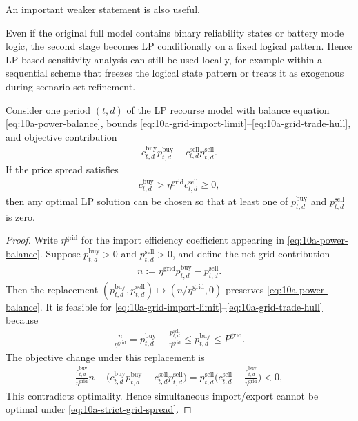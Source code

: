 An important weaker statement is also useful.

\begin{remark}
Even if the original full model contains binary reliability states or battery mode logic, the second stage becomes LP conditionally on a fixed logical pattern. Hence LP-based sensitivity analysis can still be used locally, for example within a sequential scheme that freezes the logical state pattern or treats it as exogenous during scenario-set refinement.
\end{remark}

\begin{proposition}
Consider one period \((t,d)\) of the LP recourse model with balance equation \eqref{eq:10a-power-balance}, bounds \eqref{eq:10a-grid-import-limit}--\eqref{eq:10a-grid-trade-hull}, and objective contribution
\begin{align}
c^{\mathrm{buy}}_{t,d} p^{\mathrm{buy}}_{t,d} - c^{\mathrm{sell}}_{t,d} p^{\mathrm{sell}}_{t,d}.
\end{align}
If the price spread satisfies
\begin{align}
c^{\mathrm{buy}}_{t,d} > \eta^{\mathrm{grid}} c^{\mathrm{sell}}_{t,d} \ge 0,
\label{eq:10a-strict-grid-spread}
\end{align}
then any optimal LP solution can be chosen so that at least one of \(p^{\mathrm{buy}}_{t,d}\) and \(p^{\mathrm{sell}}_{t,d}\) is zero.
\end{proposition}

\begin{proof}
Write \(\eta^{\mathrm{grid}}\) for the import efficiency coefficient appearing in \eqref{eq:10a-power-balance}. Suppose \(p^{\mathrm{buy}}_{t,d}>0\) and \(p^{\mathrm{sell}}_{t,d}>0\), and define the net grid contribution
\begin{align}
n := \eta^{\mathrm{grid}} p^{\mathrm{buy}}_{t,d} - p^{\mathrm{sell}}_{t,d}.
\end{align}
Then the replacement \((p^{\mathrm{buy}}_{t,d},p^{\mathrm{sell}}_{t,d}) \mapsto (n/\eta^{\mathrm{grid}},0)\) preserves \eqref{eq:10a-power-balance}. It is feasible for \eqref{eq:10a-grid-import-limit}--\eqref{eq:10a-grid-trade-hull} because
\begin{align}
\frac{n}{\eta^{\mathrm{grid}}} = p^{\mathrm{buy}}_{t,d} - \frac{p^{\mathrm{sell}}_{t,d}}{\eta^{\mathrm{grid}}} \le p^{\mathrm{buy}}_{t,d} \le P^{\mathrm{grid}}.
\end{align}
The objective change under this replacement is
\begin{align}
\frac{c^{\mathrm{buy}}_{t,d}}{\eta^{\mathrm{grid}}} n - \big(c^{\mathrm{buy}}_{t,d} p^{\mathrm{buy}}_{t,d} - c^{\mathrm{sell}}_{t,d} p^{\mathrm{sell}}_{t,d}\big)
= p^{\mathrm{sell}}_{t,d}\Big(c^{\mathrm{sell}}_{t,d} - \frac{c^{\mathrm{buy}}_{t,d}}{\eta^{\mathrm{grid}}}\Big) < 0,
\end{align}
This contradicts optimality. Hence simultaneous import/export cannot be optimal under \eqref{eq:10a-strict-grid-spread}.
\end{proof}

